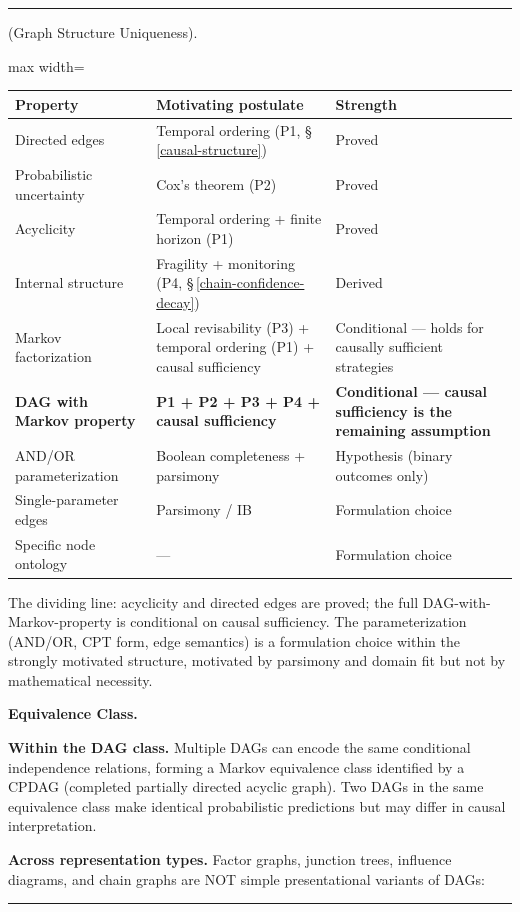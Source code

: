 \documentclass[11pt,oneside]{article}
\newcounter{claim}[section]
\renewcommand{\theclaim}{\thesection.\arabic{claim}}
\newenvironment{segment}[2]{%
  \refstepcounter{claim}%
  \bigskip\noindent\hrule\smallskip
  \noindent{\bfseries #1~\theclaim}\enskip(#2).\par\smallskip
  \noindent\ignorespaces
}{%
  \par\smallskip\noindent\hrule\bigskip
}
\newenvironment{derivation}[1][]{\begin{segment}{Derivation}{#1}}{\end{segment}}
\begin{document}
\begin{derivation}[Graph Structure Uniqueness]
\begin{adjustbox}{max width=\textwidth}
\small
\begin{tabular}{lll}
\toprule
Property & Motivating postulate & Strength \\
\midrule
Directed edges & Temporal ordering (P1, \S\,\ref{causal-structure}) & Proved \\
Probabilistic uncertainty & Cox's theorem (P2) & Proved \\
Acyclicity & Temporal ordering + finite horizon (P1) & Proved \\
Internal structure & Fragility + monitoring (P4, \S\,\ref{chain-confidence-decay}) & Derived \\
Markov factorization & Local revisability (P3) + temporal ordering (P1) + causal sufficiency & Conditional — holds for causally sufficient strategies \\
\textbf{DAG with Markov property} & \textbf{P1 + P2 + P3 + P4 + causal sufficiency} & \textbf{Conditional — causal sufficiency is the remaining assumption} \\
AND/OR parameterization & Boolean completeness + parsimony & Hypothesis (binary outcomes only) \\
Single-parameter edges & Parsimony / IB & Formulation choice \\
Specific node ontology & — & Formulation choice \\
\bottomrule
\end{tabular}
\end{adjustbox}


The dividing line: acyclicity and directed edges are proved; the full DAG-with-Markov-property is conditional on causal sufficiency. The parameterization (AND/OR, CPT form, edge semantics) is a formulation choice within the strongly motivated structure, motivated by parsimony and domain fit but not by mathematical necessity.


\medskip\noindent\textbf{Equivalence Class.}


\textbf{Within the DAG class.} Multiple DAGs can encode the same conditional independence relations, forming a Markov equivalence class identified by a CPDAG (completed partially directed acyclic graph). Two DAGs in the same equivalence class make identical probabilistic predictions but may differ in causal interpretation.

\textbf{Across representation types.} Factor graphs, junction trees, influence diagrams, and chain graphs are NOT simple presentational variants of DAGs:


\end{derivation}
\end{document}
